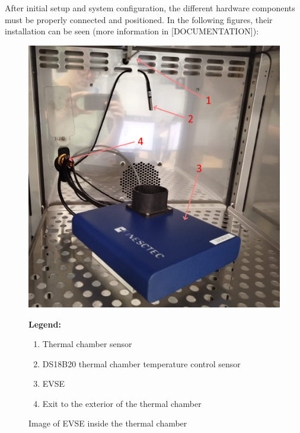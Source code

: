 After initial setup and system configuration, the different hardware components must be properly connected and positioned. In the following figures, their installation can be seen (more information in [DOCUMENTATION]):

\begin{figure}[H]
    \centering
    \begin{minipage}{0.6\textwidth}
        \includegraphics[width=\linewidth]{figures/inst_inside_1.png}
    \end{minipage}%
    \hfill
    \begin{minipage}{0.35\textwidth}
        \small
        \textbf{Legend:}
        \begin{enumerate}
            \item Thermal chamber sensor
            \item DS18B20 thermal chamber temperature control sensor
            \item EVSE
            \item Exit to the exterior of the thermal chamber
        \end{enumerate}
    \end{minipage}
    \caption{Image of EVSE inside the thermal chamber}
    \label{fig:inst_inside_1}
\end{figure}

